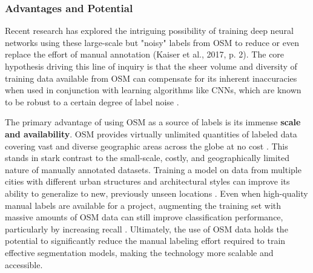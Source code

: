\documentclass{report}
\begin{document}
\subsubsection{Advantages and Potential}
Recent research has explored the intriguing possibility of training deep neural networks using these large-scale but "noisy" labels from OSM to reduce or even replace the effort of manual annotation (Kaiser et al., 2017, p. 2). The core hypothesis driving this line of inquiry is that the sheer volume and diversity of training data available from OSM can compensate for its inherent inaccuracies when used in conjunction with learning algorithms like CNNs, which are known to be robust to a certain degree of label noise \parencites[p.~2]{KaiserEtAlLearningAerialImageSegmentationOnlineMaps2017}. \par
The primary advantage of using OSM as a source of labels is its immense \textbf{scale and availability}. OSM provides virtually unlimited quantities of labeled data covering vast and diverse geographic areas across the globe at no cost \parencites[p.~1f.]{KaiserEtAlLearningAerialImageSegmentationOnlineMaps2017}. This stands in stark contrast to the small-scale, costly, and geographically limited nature of manually annotated datasets. Training a model on data from multiple cities with different urban structures and architectural styles can improve its ability to generalize to new, previously unseen locations \parencites[p.~7]{KaiserEtAlLearningAerialImageSegmentationOnlineMaps2017}. Even when high-quality manual labels are available for a project, augmenting the training set with massive amounts of OSM data can still improve classification performance, particularly by increasing recall \parencites[p.~11]{KaiserEtAlLearningAerialImageSegmentationOnlineMaps2017}. Ultimately, the use of OSM data holds the potential to significantly reduce the manual labeling effort required to train effective segmentation models, making the technology more scalable and accessible.\par
\end{document}
